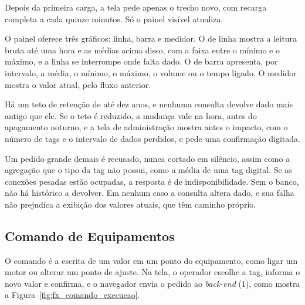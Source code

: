 \par Depois da primeira carga, a tela pede apenas o trecho novo, com recarga completa a cada quinze minutos. Só o painel visível atualiza.

\par O painel oferece três gráficos: linha, barra e medidor. O de linha mostra a leitura bruta até uma hora e as médias acima disso, com a faixa entre o mínimo e o máximo, e a linha se interrompe onde falta dado. O de barra apresenta, por intervalo, a média, o mínimo, o máximo, o volume ou o tempo ligado. O medidor mostra o valor atual, pelo fluxo anterior.

\par Há um teto de retenção de até dez anos, e nenhuma consulta devolve dado mais antigo que ele. Se o teto é reduzido, a mudança vale na hora, antes do apagamento noturno, e a tela de administração mostra antes o impacto, com o número de tags e o intervalo de dados perdidos, e pede uma confirmação digitada.

\par Um pedido grande demais é recusado, nunca cortado em silêncio, assim como a agregação que o tipo da tag não possui, como a média de uma tag digital. Se as conexões pesadas estão ocupadas, a resposta é de indisponibilidade. Sem o banco, não há histórico a devolver. Em nenhum caso a consulta altera dado, e sua falha não prejudica a exibição dos valores atuais, que têm caminho próprio.

\subsection{Comando de Equipamentos}

\par O comando é a escrita de um valor em um ponto do equipamento, como ligar um motor ou alterar um ponto de ajuste. Na tela, o operador escolhe a tag, informa o novo valor e confirma, e o navegador envia o pedido ao \emph{back-end} (1), como mostra a Figura~\ref{fig:fx_comando_execucao}.

